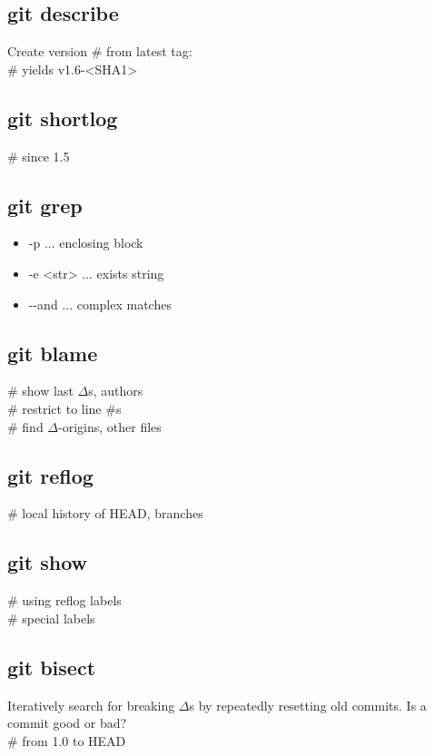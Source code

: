 \subsection*{git describe}
Create version \# from latest tag:\\
 \# yields v1.6-<SHA1>\\

\subsection*{git shortlog}
 \# since 1.5\\

\subsection*{git grep}
\begin{itemize}
    \item -p ... enclosing block
    \item -e <str> ... exists string
    \item -{}-and ... complex matches
\end{itemize}

\subsection*{git blame}
 \# show last $\Delta$s, authors\\
 \# restrict to line \#s\\
 \# find $\Delta$-origins, other files\\


\subsection*{git reflog}
 \# local history of HEAD, branches \\


\subsection*{git show}
 \# using reflog labels \\
 \# special labels \\


\subsection*{git bisect}
Iteratively search for breaking $\Delta$s by repeatedly resetting old commits. Is a commit good or bad?\\
 \# from 1.0 to HEAD\\


